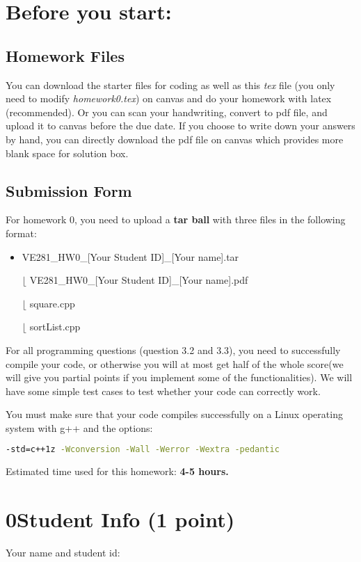 \documentclass[11pt]{exam}
\begin{document}
\setlength{\parindent}{0pt}
\section*{Before you start:}

\subsection*{Homework Files}
You can download the starter files for coding as well as this \textit{tex} file (you only need to modify \textit{homework0.tex}) on canvas and do your homework with latex (recommended). Or you can scan your handwriting, convert to pdf file, and upload it to canvas before the due date. If you choose to write down your answers by hand, you can directly download the pdf file on canvas which provides more blank space for solution box.\\

\subsection*{Submission Form}
For homework 0, you need to upload a \textbf{tar ball} with three files in the following format:
\begin{itemize}
\item VE281\_HW0\_[Your Student ID]\_[Your name].tar

$\lfloor$ VE281\_HW0\_[Your Student ID]\_[Your name].pdf

$\lfloor$ square.cpp

$\lfloor$ sortList.cpp
\end{itemize}

For all programming questions (question 3.2 and 3.3), you need to successfully compile your code, or otherwise you will at most get half of the whole score(we will give you partial points if you implement some of the functionalities). We will have some simple test cases to test whether your code can correctly work.

You must make sure that your code compiles successfully on a Linux operating system with g++ and the options:
\begin{lstlisting}[language=bash]
-std=c++1z -Wconversion -Wall -Werror -Wextra -pedantic
\end{lstlisting}

Estimated time used for this homework: \textbf{4-5 hours.}

\newpage
\section*{0\quad Student Info (1 point)}
Your name and student id:
\begin{solution}
\end{solution}
\end{document}
